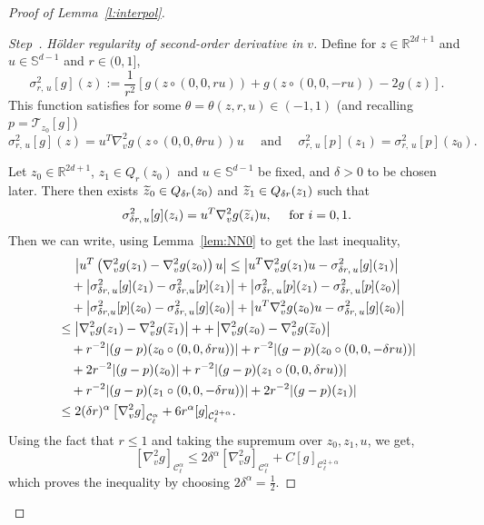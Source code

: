 \documentclass[AHL,Unicode,longabstracts,published]{cedram}
\newcommand{\R}{\mathbb{R}}
\newcommand{\bbS}{\mathbb{S}}
\newcommand{\cC}{\mathcal{C}}
\newcommand{\cT}{\mathcal{T}}
\newcounter{stepcount}
\newenvironment{step}[1]{\refstepcounter{stepcount}\begin{proof}[Step~\thestepcount]{\emph{#1}}}{\let\qed\relax\end{proof}}
\let\oldtilde\tilde
\renewcommand*{\tilde}[1]{\mathchoice{\widetilde{#1}}{\widetilde{#1}}{\oldtilde{#1}}{\oldtilde{#1}}}
\begin{document}
\begin{proof}[Proof of Lemma~\ref{l:interpol}]
\begin{step}{H\"older regularity of second-order derivative in $v$.\label{step4}}
Define for $z \in \R^{2d+1}$ and $u \in \bbS^{d-1}$ and $r \in (0,1]$,
\[
\sigma^2 _{r,\,u}[g](z) := \frac{1}{r^2} \left[g(z \circ (0,0,ru)) + g(z \circ (0,0,-ru)) - 2 g(z) \right].
\]
This function satisfies for some $\theta = \theta (z,r,u) \in (-1,1)$ (and recalling $p=\cT_{z_0}[g]$)
\[
\sigma^2_{r,\,u} [g] (z) = u^T \nabla_v ^2 g (z \circ (0,0,\theta r u)) u \quad \text{ and } \quad \sigma_{r,\,u}^2[p](z_1) =
\sigma_{r,\,u}^2[p](z_0).
\]

Let $z_0 \in \R^{2d+1}$, $z_1 \in Q_r (z_0)$ and $u \in \bbS^{d-1}$ be fixed, and $\delta >0$ to be chosen later. There then exists $\tilde z_0 \in Q_{\delta r} (z_0)$ and $\tilde z_1 \in Q_{\delta r} (z_1)$ such that
\[
\sigma_{\delta r,\,u}^2 [g] (z_i) = u^T \nabla_v ^2g (\tilde z_i)u, \quad \text{ for } i=0,1.
\]
Then we can write, using Lemma~\ref{lem:NN0} to get the last inequality,
\begin{multline*}
\left| u^T \left(\nabla_v ^2 g(z_1) - \nabla_v ^2 g(z_0) \right)u\right|
\le \left| u^T \nabla_v ^2 g(z_1) u - \sigma _{\delta r,\,u}^2[g](z_1) \right| \\
\begin{aligned}
&\quad+ \left| \sigma _{\delta r,\,u}^2 [g](z_1) - \sigma _{\delta r,u}^2 [p](z_1) \right| + \left| \sigma_{\delta r,\,u}^2 [p](z_1) - \sigma_{\delta r,\,u}^2[p](z_0) \right| \\
&\quad+\left| \sigma_{\delta r,u}^2[p](z_0) - \sigma_{\delta r,\,u}^2 [g](z_0) \right| + \left| u^T \nabla_v ^2 g(z_0) u -\sigma_{\delta r,\,u}^2 [g](z_0) \right| \\
& \le \left| \nabla_v ^2 g(z_1) - \nabla_v ^2 g (\tilde z_1) \right| + + \left| \nabla_v ^2 g(z_0) -\nabla_v ^2 g (\tilde z_0) \right| \\
& \quad + r^{-2} |(g-p) (z_0 \circ (0,0,\delta r u))| + r^{-2} |(g-p) (z_0 \circ (0,0,-\delta r u))| \\
&\quad + 2 r^{-2} |(g-p) (z_0)| + r^{-2} |(g-p) (z_1 \circ (0,0,\delta r u))| \\
 & \quad + r^{-2} |(g-p) (z_1 \circ (0,0,-\delta r u))| + 2 r^{-2} |(g-p) (z_1)|\\
& \le 2 (\delta r)^\alpha \left[\nabla_v ^2g\right]_{\cC_\ell^\alpha} + 6 r^{\alpha} [g]_{\cC^{2+\alpha}_\ell }.
\end{aligned}
\end{multline*}
Using the fact that $r \le 1$ and taking the supremum over $z_0,z_1, u$, we get,
\[
\left[\nabla_v ^2 g\right]_{\cC_\ell^\alpha} \le 2 \delta ^\alpha \left[\nabla_v ^2 g\right]_{\cC_\ell^\alpha} + C [g]_{\cC^{2+\alpha}_\ell }
\]
which proves the inequality by choosing $2 \delta^\alpha = \frac{1}{2}$.
\end{step}
%


\end{proof}
\end{document}
